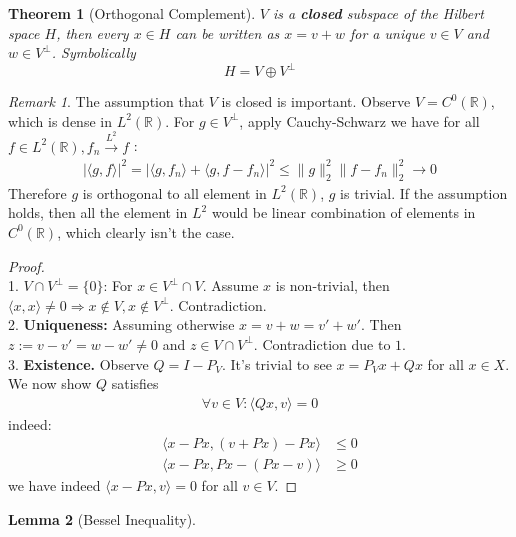 \documentclass[a4paper,11pt,fleqn]{book}
\newtheorem{theorem}{Theorem}[section]
\newtheorem{lemma}[theorem]{Lemma}
\theoremstyle{definition}
\theoremstyle{remark}
\newtheorem*{remark}{Remark}
\begin{document}
\begin{theorem}[Orthogonal Complement]
$V$ is a \textbf{closed} subspace of the Hilbert space $H$, then every $x \in H$ can be written as $x = v + w$ for a unique $v \in V$ and $w \in V^\perp$. Symbolically
\begin{equation*}
	H = V \oplus V^\perp
\end{equation*}
\end{theorem}
\begin{remark}
The assumption that $V$ is closed is important. Observe $V = C^0(\mathbb{R})$, which is dense in $L^2(\mathbb{R})$. For $g \in V^\perp$, apply Cauchy-Schwarz we have for all $f \in L^2(\mathbb{R}), f_n \overset{L^2}{\rightarrow} f$ :
\begin{align*}
	|\langle g, f\rangle|^2 = |\langle g, f_n \rangle + \langle g, f - f_n\rangle|^2 \le \|g\|_2^2 \|f - f_n\|_2^2 \rightarrow 0
\end{align*}	
Therefore $g$ is orthogonal to all element in $L^2(\mathbb{R})$, $g$ is trivial. If the assumption holds, then all the element in $L^2$ would be linear combination of elements in $C^0(\mathbb{R})$, which clearly isn't the case.
\end{remark}
\begin{proof}
	\quad\\ 1. $V \cap V^\perp = \{0\}$: For $x \in V^\perp \cap V$. Assume $x$ is non-trivial, then $\langle x , x \rangle \neq 0 \Rightarrow x \notin V, x \notin V^\perp$. Contradiction.\\
	2. \textbf{Uniqueness:} Assuming otherwise $x = v + w = v' + w'$. Then $z:= v - v' = w - w' \neq 0$ and $z \in V \cap V^\perp$. Contradiction due to $1$. \\
	3. \textbf{Existence.} Observe $Q = I - P_V$. It's trivial to see $x = P_Vx + Qx$ for all $x \in X$. We now show $Q$ satisfies 
	\begin{align*}
		\forall v \in V: \langle Qx, v\rangle = 0
	\end{align*}
	indeed:
	\begin{align*}
		\langle x - Px, (v + Px) - Px \rangle &\le 0\\
		\langle x - Px, Px - (Px - v) \rangle &\ge 0
	\end{align*}
	we have indeed $\langle x - Px, v \rangle = 0$ for all $v \in V$. 
\end{proof}

\begin{lemma}[Bessel Inequality]
	
\end{lemma}
\end{document}
